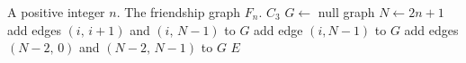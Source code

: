 
\begin{algorithmic}[1]
\Require A positive integer $n$.
\Ensure The friendship graph $F_n$.
  \State \Return $C_3$
\EndIf
\State $G \gets$ null graph
\State $N \gets 2n + 1$
    \State add edges $(i,\, i+1)$ and $(i,\, N-1)$ to $G$
  \Else
    \State add edge $(i, N-1)$ to $G$
  \EndIf
\EndFor
\State add edges $(N-2,\, 0)$ and $(N-2,\, N-1)$ to $G$
\State \Return $E$
\end{algorithmic}
